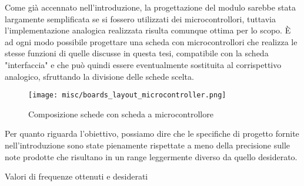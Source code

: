 


Come già accennato nell'introduzione, la progettazione del modulo sarebbe stata largamente
semplificata se si fossero utilizzati dei microcontrollori, tuttavia l'implementazione
analogica realizzata risulta comunque ottima per lo scopo. È ad ogni modo possibile progettare
una scheda con microcontrollori che realizza le stesse funzioni di quelle discusse in questa
tesi, compatibile con la scheda "interfaccia" e che può quindi essere eventualmente sostituita
al corrispettivo analogico, sfruttando la divisione delle schede scelta.

\begin{figure}[H]
    \centering
    \texttt{[image: misc/boards\_layout\_microcontroller.png]}
    \caption{Composizione schede con scheda a microcontrollore}
    \label{boards_layout_microcontroller}
\end{figure}

Per quanto riguarda l'obiettivo, possiamo dire che le specifiche di progetto fornite
nell'introduzione sono state pienamente rispettate a meno della precisione sulle
note prodotte che risultano in un range leggermente diverso da quello desiderato.

\begin{table}[H]
    \centering
    \caption{Valori di frequenze ottenuti e desiderati}
    \label{freq_table}
\end{table}

